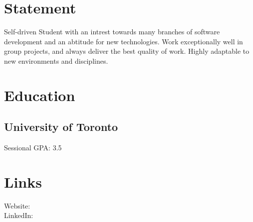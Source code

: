 \documentclass[]{dans-resume}
\begin{document}

\begin{minipage}[t]{0.30\textwidth}

\section{Statement}
Self-driven Student with an intrest towards many branches of software development and an abtitude for new technologies. Work exceptionally well in group projects, and always deliver the best quality of work. Highly adaptable to new environments and disciplines.
\sectionsep

\section{Education}
\subsection{University of Toronto}
Sessional GPA: 3.5
\sectionsep

\section{Links}
Website: \href{https://danielrazavi.github.io/}{} \\
LinkedIn: \href{https://www.linkedin.com/in/danielrazavi}{} \\
\sectionsep


\end{minipage}
\end{document}
